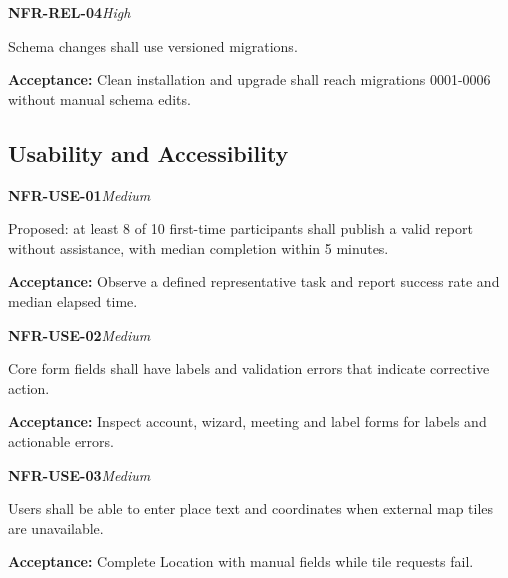 \documentclass[12pt,a4paper,oneside]{report}
\begin{document}
\noindent\begin{minipage}{\linewidth}\textbf{NFR-REL-04}\hfill\textit{High}\par\nopagebreak

Schema changes shall use versioned migrations.

{\color{muted}\textbf{Acceptance:} Clean installation and upgrade shall reach migrations 0001-0006 without manual schema edits.\par}\end{minipage}\par\vspace{5pt}


\subsection{Usability and Accessibility}

\noindent\begin{minipage}{\linewidth}\textbf{NFR-USE-01}\hfill\textit{Medium}\par\nopagebreak

Proposed: at least 8 of 10 first-time participants shall publish a valid report without assistance, with median completion within 5 minutes.

{\color{muted}\textbf{Acceptance:} Observe a defined representative task and report success rate and median elapsed time.\par}\end{minipage}\par\vspace{5pt}

\noindent\begin{minipage}{\linewidth}\textbf{NFR-USE-02}\hfill\textit{Medium}\par\nopagebreak

Core form fields shall have labels and validation errors that indicate corrective action.

{\color{muted}\textbf{Acceptance:} Inspect account, wizard, meeting and label forms for labels and actionable errors.\par}\end{minipage}\par\vspace{5pt}

\noindent\begin{minipage}{\linewidth}\textbf{NFR-USE-03}\hfill\textit{Medium}\par\nopagebreak

Users shall be able to enter place text and coordinates when external map tiles are unavailable.

{\color{muted}\textbf{Acceptance:} Complete Location with manual fields while tile requests fail.\par}\end{minipage}\par\vspace{5pt}
\end{document}
